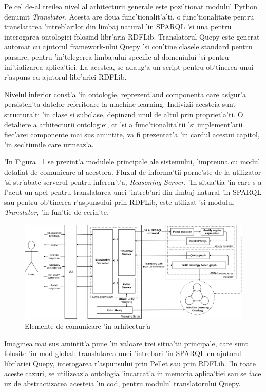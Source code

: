 \documentclass[12pt,a4paper,twoside]{report}
\begin{document}
Pe cel de-al treilea nivel al arhitecturii generale este pozi'tionat modulul Python denumit {\it Translator}. Acesta are doua func'tionalit'a'ti, o func'tionalitate pentru translatarea 'intreb'arilor din limbaj natural 'in SPARQL 'si una pentru interogarea ontologiei folosind libr'aria RDFLib. Translatorul Quepy este generat automat cu ajutorul framework-ului Quepy 'si con'tine clasele standard pentru parsare, pentru 'in'telegerea limbajului specific al domeniului 'si pentru ini'tializarea aplica'tiei. La acestea, se adaug'a un script pentru ob'tinerea unui r'aspuns cu ajutorul libr'ariei RDFLib.

Nivelul inferior const'a 'in ontologie, reprezent'and componenta care asigur'a persisten'ta datelor referitoare la machine learning. Indivizii acesteia sunt structura'ti 'in clase si subclase, depinz\ia nd unul de altul prin propriet'a'ti. O detaliere a arhitecturii ontologiei, c\ia t 'si a func'tionalita'tii 'si implement'arii fiec'arei componente mai sus amintite, va fi prezentat'a 'in cardul acestui capitol, 'in sec'tiunile care urmeaz'a. 

'In Figura ~\ref{fig:arch_det} se prezint'a modulele principale ale sistemului, 'impreuna cu modul detaliat de comunicare al acestora. Fluxul de informa'tii porne'ste de la utilizator 'si str'abate serverul pentru inferen't'a, {\it Reasoning Server}. 'In situa'tia 'in care s-a f'acut un apel pentru translatarea unei 'intreb'ari din limbaj natural 'in SPARQL sau pentru ob'tinerea r'aspunsului prin RDFLib, este utilizat 'si modulul {\it Translator}, 'in fun'tie de cerin'te. 

\begin{figure}
    \centering
    \includegraphics[width = 0.75\linewidth]{img/architecture_details.png}
        \caption{Elemente de comunicare 'in arhitectur'a}
    \label{fig:arch_det}
\end{figure}

Imaginea mai sus amintit'a pune 'in valoare trei situa'tii principale, care sunt folosite 'in mod global: translatarea unei 'intrebari 'in SPARQL cu ajutorul libr'ariei Quepy, interogarea r'aspunsului prin Pellet sau prin RDFLib. 'In toate aceste cazuri, se utilizeaz'a ontologia 'incarcat'a in memoria aplica'tiei sau se face uz de abstractizarea acesteia 'in cod, pentru modulul translatorului Quepy.
\end{document}
